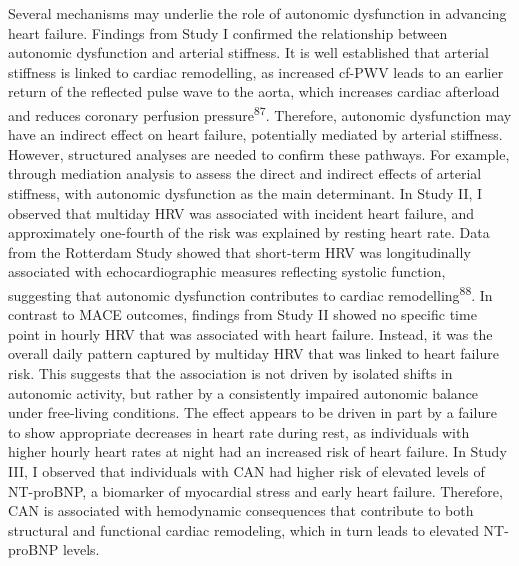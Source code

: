 \documentclass[
  a4paper,
  headsepline=true,
  open=any]{scrbook}
\begin{document}
Several mechanisms may underlie the role of autonomic dysfunction in
advancing heart failure. Findings from Study I confirmed the
relationship between autonomic dysfunction and arterial stiffness. It is
well established that arterial stiffness is linked to cardiac
remodelling, as increased cf-PWV leads to an earlier return of the
reflected pulse wave to the aorta, which increases cardiac afterload and
reduces coronary perfusion pressure\textsuperscript{87}. Therefore,
autonomic dysfunction may have an indirect effect on heart failure,
potentially mediated by arterial stiffness. However, structured analyses
are needed to confirm these pathways. For example, through mediation
analysis to assess the direct and indirect effects of arterial
stiffness, with autonomic dysfunction as the main determinant. In Study
II, I observed that multiday HRV was associated with incident heart
failure, and approximately one-fourth of the risk was explained by
resting heart rate. Data from the Rotterdam Study showed that short-term
HRV was longitudinally associated with echocardiographic measures
reflecting systolic function, suggesting that autonomic dysfunction
contributes to cardiac remodelling\textsuperscript{88}. In contrast to
MACE outcomes, findings from Study II showed no specific time point in
hourly HRV that was associated with heart failure. Instead, it was the
overall daily pattern captured by multiday HRV that was linked to heart
failure risk. This suggests that the association is not driven by
isolated shifts in autonomic activity, but rather by a consistently
impaired autonomic balance under free-living conditions. The effect
appears to be driven in part by a failure to show appropriate decreases
in heart rate during rest, as individuals with higher hourly heart rates
at night had an increased risk of heart failure. In Study III, I
observed that individuals with CAN had higher risk of elevated levels of
NT-proBNP, a biomarker of myocardial stress and early heart failure.
Therefore, CAN is associated with hemodynamic consequences that
contribute to both structural and functional cardiac remodeling, which
in turn leads to elevated NT-proBNP levels.
\end{document}
